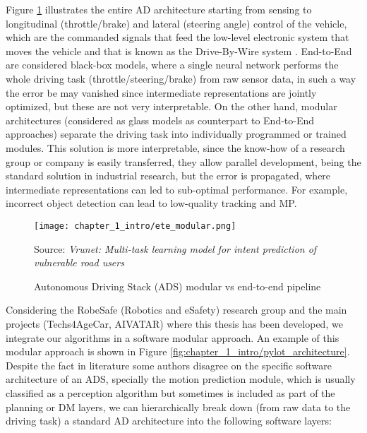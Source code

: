 Figure \ref{fig:chapter_1_intro/ete_modular} illustrates the entire \ac{AD} architecture starting from sensing to longitudinal (throttle/brake) and lateral (steering angle) control of the vehicle, which are the commanded signals that feed the low-level electronic system that moves the vehicle and that is known as the Drive-By-Wire system \cite{arango2020drive}. End-to-End are considered black-box models, where a single neural network performs the whole driving task (throttle/steering/brake) from raw sensor data, in such a way the error be may vanished since intermediate representations are jointly optimized, but these are not very interpretable. On the other hand, modular architectures (considered as glass models as counterpart to End-to-End approaches) separate the driving task into individually programmed or trained modules. This solution is more interpretable, since the know-how of a research group or company is easily transferred, they allow parallel development, being the standard solution in industrial research, but the error is propagated, where intermediate representations can led to sub-optimal performance. For example, incorrect object detection can lead to low-quality tracking and \ac{MP}.

\begin{figure}[h]
	\centering
	\texttt{[image: chapter\_1\_intro/ete\_modular.png]}
	\caption{Autonomous Driving Stack (ADS) modular vs end-to-end pipeline}
	Source: \textit{Vrunet: Multi-task learning model for intent prediction of vulnerable road users} \cite{ranga2020vrunet}
	\label{fig:chapter_1_intro/ete_modular}
\end{figure}

Considering the RobeSafe (Robotics and eSafety) research group and the main projects (Techs4AgeCar, AIVATAR) where this thesis has been developed, we integrate our algorithms in a software modular approach. An example of this modular approach is shown in Figure \ref{fig:chapter_1_intro/pylot_architecture}. Despite the fact in literature some authors disagree on the specific software architecture of an \ac{ADS}, specially the motion prediction module, which is usually classified as a perception algorithm but sometimes is included as part of the planning or \ac{DM} layers, we can hierarchically break down (from raw data to the driving task) a standard \ac{AD} architecture into the following software layers:

